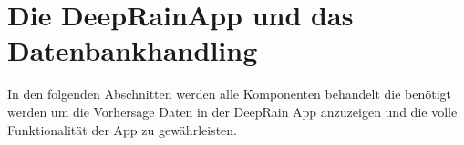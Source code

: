 \section{Die DeepRainApp und das Datenbankhandling}\label{die deeprain app und das datenbankhandling}
In den folgenden Abschnitten werden alle Komponenten behandelt die benötigt werden um die Vorhersage Daten in der DeepRain App anzuzeigen und die volle Funktionalität der App zu gewährleisten.  





